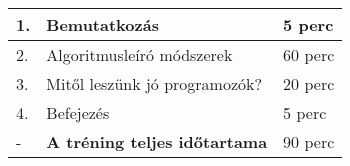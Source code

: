 \documentclass[../Main.tex]{subfiles}
\begin{document}
\begin{center}
    \begin{tabular}{| m{1.3 em} | m{} | m{} |}
    \hline
    1. & Bemutatkozás & 5 perc \\
    \hline
    2. & Algoritmusleíró módszerek & 60 perc \\
    \hline
    3. & Mitől leszünk jó programozók? & 20 perc \\
    \hline
    4. & Befejezés & 5 perc \\
    \hline
    - & \textbf{A tréning teljes időtartama} & 90 perc \\
    \hline
    \end{tabular}
\end{center}
\end{document}
